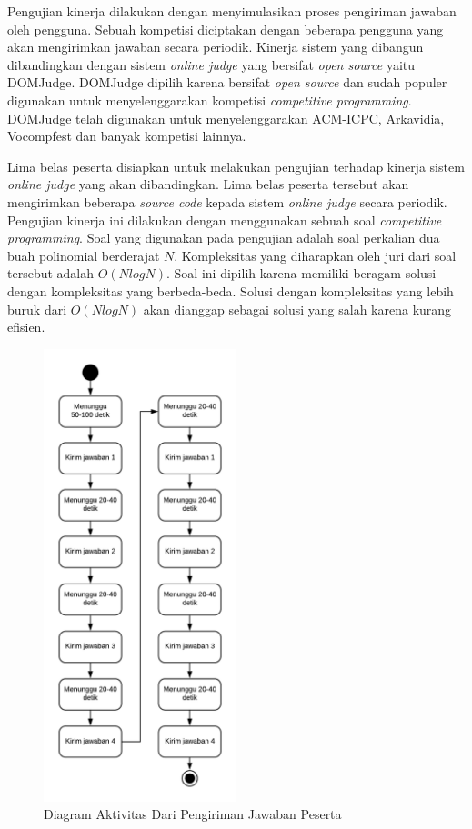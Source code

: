 \par Pengujian kinerja dilakukan dengan menyimulasikan proses pengiriman jawaban oleh pengguna. Sebuah kompetisi diciptakan dengan beberapa pengguna yang akan mengirimkan jawaban secara periodik. Kinerja sistem yang dibangun dibandingkan dengan sistem \textit{online judge} yang bersifat \textit{open source} yaitu DOMJudge. DOMJudge dipilih karena bersifat \textit{open source} dan sudah populer digunakan untuk menyelenggarakan kompetisi \textit{competitive programming}. DOMJudge telah digunakan untuk menyelenggarakan ACM-ICPC, Arkavidia, Vocompfest dan banyak kompetisi lainnya.

\par Lima belas peserta disiapkan untuk melakukan pengujian terhadap kinerja sistem \textit{online judge} yang akan dibandingkan. Lima belas peserta tersebut akan mengirimkan beberapa \textit{source code} kepada sistem \textit{online judge} secara periodik. Pengujian kinerja ini dilakukan dengan menggunakan sebuah soal \textit{competitive programming}. Soal yang digunakan pada pengujian adalah soal perkalian dua buah polinomial berderajat $N$. Kompleksitas yang diharapkan oleh juri dari soal tersebut adalah $O(N log N)$. Soal ini dipilih karena memiliki beragam solusi dengan kompleksitas yang berbeda-beda. Solusi dengan kompleksitas yang lebih buruk dari $O(N log N)$ akan dianggap sebagai solusi yang salah karena kurang efisien.

\begin{figure}[ht!]
    \centering
    \includegraphics[width=0.5\textwidth]{images/performance-testing-activity}
    \caption{Diagram Aktivitas Dari Pengiriman Jawaban Peserta}
    \label{fig:performance-testing-activity}
\end{figure}

